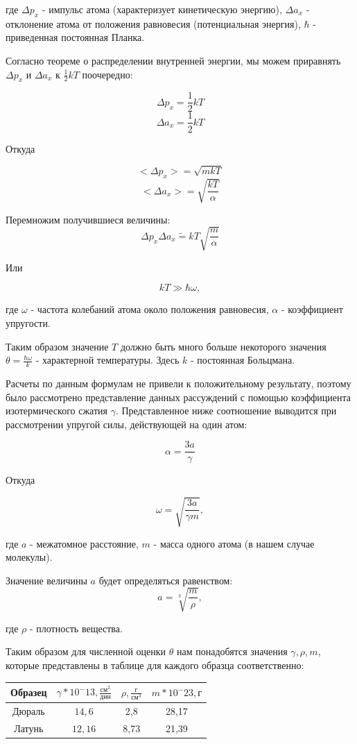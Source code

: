 \documentclass[a4paper,12pt]{article}
\begin{document}
где $\Delta p_x$ - импульс атома (характеризует кинетическую энергию), $\Delta a_x$ - отклонение атома от положения равновесия (потенциальная энергия), $\hbar$ - приведенная постоянная Планка.

Согласно теореме о распределении внутренней энергии, мы можем приравнять $\Delta p_x$ и $\Delta a_x$ к $\frac{1}{2}kT$ поочередно:

$$\Delta p_x = \frac{1}{2}kT$$
$$\Delta a_x = \frac{1}{2}kT$$

Откуда

$$<\Delta p_x> = \sqrt{mkT}$$
$$<\Delta a_x> = \sqrt{\frac{kT}{\alpha}}$$

\newpage
\hspace{\parindent}Перемножим получившиеся величины:
$$\Delta p_x \Delta a_x \widetilde{=} kT\sqrt{\frac{m}{\alpha}}$$

Или

$$kT \gg \hbar\omega,$$

где $\omega$ - частота колебаний атома около положения равновесия, $\alpha$ - коэффициент упругости.

Таким образом значение $T$ должно быть много больше некоторого значения $\theta = \frac{\hbar\omega}{k}$ - характерной температуры. Здесь $k$ - постоянная Больцмана.

Расчеты по данным формулам не привели к положительному результату, поэтому было рассмотрено представление данных рассуждений с помощью коэффициента изотермического сжатия $\gamma$. Представленное ниже соотношение выводится при рассмотрении упругой силы, действующей на один атом:

$$\alpha = \frac{3a}{\gamma}$$

Откуда

$$\omega = \sqrt{\frac{3a}{\gamma m}},$$

где $a$ - межатомное расстояние, $m$ - масса одного атома (в нашем случае молекулы).

Значение величины $a$ будет определяться равенством:
$$a = \sqrt[3]{\frac{m}{\rho}},$$

где $\rho$ - плотность вещества.

Таким образом для численной оценки $\theta$ нам понадобятся значения $\gamma, \rho, m$, которые представлены в таблице для каждого образца соответственно:

\begin{center}

	\begin{tabular}{|c|c|c|c|}
		
		\hline
		Образец&	$\gamma*10^-13, \frac{см^2}{дин}$& $\rho, \frac{г}{см^3}$& $m*10^-23, г$
		\\
		\hline
		Дюраль&	$14,6$& 2,8& 28,17
		\\
		Латунь&	$12,16$& 8,73& 21,39
		\\
		\hline		
		
	\end{tabular}
\end{center}
\end{document}
